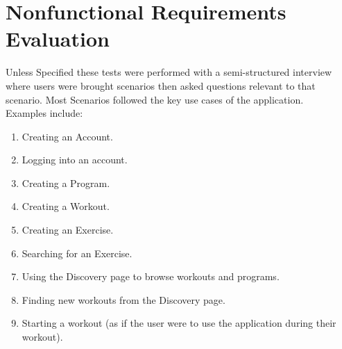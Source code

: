 \documentclass[12pt, titlepage]{article}
\begin{document}
\section{Nonfunctional Requirements Evaluation}
Unless Specified these tests were performed with a semi-structured interview where users were brought scenarios then asked questions relevant to that scenario. Most Scenarios followed the key use cases of the application.\\
Examples include:
\begin{enumerate}
	\item Creating an Account.
	\item Logging into an account.
	\item Creating a Program.
	\item Creating a Workout.
	\item Creating an Exercise.
	\item Searching for an Exercise.
	\item Using the Discovery page to browse workouts and programs.
	\item Finding new workouts from the Discovery page.
	\item Starting a workout (as if the user were to use the application during their workout).
\end{enumerate}
\end{document}
